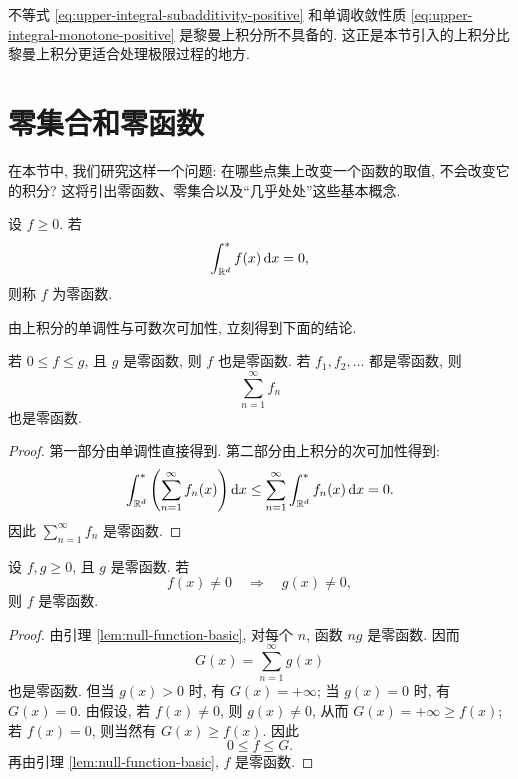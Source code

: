 \begin{rem}
	不等式 \eqref{eq:upper-integral-subadditivity-positive} 和单调收敛性质 \eqref{eq:upper-integral-monotone-positive} 是黎曼上积分所不具备的. 这正是本节引入的上积分比黎曼上积分更适合处理极限过程的地方.
\end{rem}

\clearpage

\section{零集合和零函数}
\label{sec:null-sets-and-null-functions}

在本节中, 我们研究这样一个问题: 在哪些点集上改变一个函数的取值, 不会改变它的积分? 这将引出零函数、零集合以及``几乎处处''这些基本概念.

\begin{defn}[零函数]
	\label{def:null-function}
	设 \(f\geq0\). 若
	\[
	\int_{\mathbb{R}^d}^{*}f(x)\,\dd x=0,
	\]
	则称 \(f\) 为零函数.
\end{defn}

由上积分的单调性与可数次可加性, 立刻得到下面的结论.

\begin{lem}\label{lem:null-function-basic}
	若 \(0\leq f\leq g\), 且 \(g\) 是零函数, 则 \(f\) 也是零函数. 若 \(f_1,f_2,\ldots\) 都是零函数, 则
	\[
	\sum_{n=1}^{\infty}f_n
	\]
	也是零函数.
\end{lem}

\begin{proof}
	第一部分由单调性直接得到. 第二部分由上积分的次可加性得到:
	\[
	\int_{\mathbb{R}^d}^{*}\left(\sum_{n=1}^{\infty}f_n(x)\right)\dd x
	\leq
	\sum_{n=1}^{\infty}\int_{\mathbb{R}^d}^{*}f_n(x)\,\dd x=0.
	\]
	因此 \(\sum_{n=1}^{\infty}f_n\) 是零函数.
\end{proof}

\begin{thm}\label{thm:null-function-supported-on-null-function}
	设 \(f,g\geq0\), 且 \(g\) 是零函数. 若
	\[
	f(x)\neq0\quad \Longrightarrow\quad g(x)\neq0,
	\]
	则 \(f\) 是零函数.
\end{thm}

\begin{proof}
	由引理 \ref{lem:null-function-basic}, 对每个 \(n\), 函数 \(ng\) 是零函数. 因而
	\[
	G(x)=\sum_{n=1}^{\infty}g(x)
	\]
	也是零函数. 但当 \(g(x)>0\) 时, 有 \(G(x)=+\infty\); 当 \(g(x)=0\) 时, 有 \(G(x)=0\). 由假设, 若 \(f(x)\neq0\), 则 \(g(x)\neq0\), 从而 \(G(x)=+\infty\geq f(x)\); 若 \(f(x)=0\), 则当然有 \(G(x)\geq f(x)\). 因此
	\[
	0\leq f\leq G.
	\]
	再由引理 \ref{lem:null-function-basic}, \(f\) 是零函数.
\end{proof}

